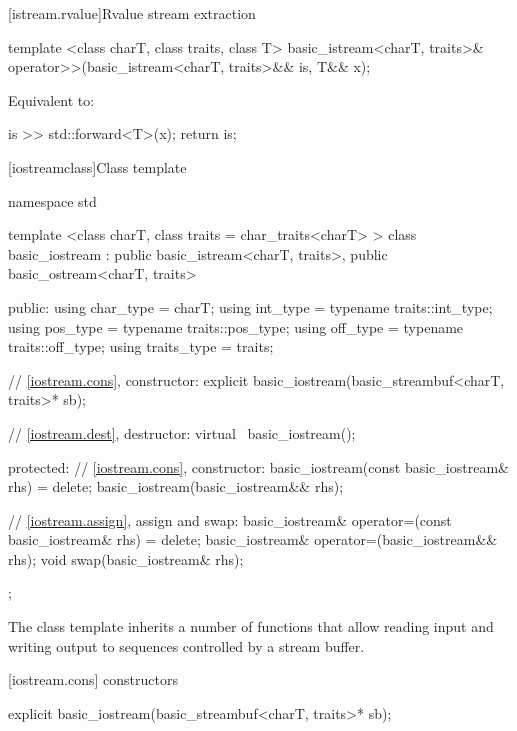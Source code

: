 [istream.rvalue]{Rvalue stream extraction}

%
\begin{itemdecl}
template <class charT, class traits, class T>
  basic_istream<charT, traits>&
  operator>>(basic_istream<charT, traits>&& is, T&& x);
\end{itemdecl}

\begin{itemdescr}
\pnum
\effects Equivalent to:
\begin{codeblock}
is >> std::forward<T>(x);
return is;
\end{codeblock}
\end{itemdescr}

[iostreamclass]{Class template }

%
\begin{codeblock}
namespace std {
  template <class charT, class traits = char_traits<charT> >
  class basic_iostream
    : public basic_istream<charT, traits>,
      public basic_ostream<charT, traits> {
  public:
    using char_type   = charT;
    using int_type    = typename traits::int_type;
    using pos_type    = typename traits::pos_type;
    using off_type    = typename traits::off_type;
    using traits_type = traits;

    // \ref{iostream.cons}, constructor:
    explicit basic_iostream(basic_streambuf<charT, traits>* sb);

    // \ref{iostream.dest}, destructor:
    virtual ~basic_iostream();

  protected:
    // \ref{iostream.cons}, constructor:
    basic_iostream(const basic_iostream& rhs) = delete;
    basic_iostream(basic_iostream&& rhs);

    // \ref{iostream.assign}, assign and swap:
    basic_iostream& operator=(const basic_iostream& rhs) = delete;
    basic_iostream& operator=(basic_iostream&& rhs);
    void swap(basic_iostream& rhs);
  };
}
\end{codeblock}

\pnum
The class template
inherits a number of functions that allow reading input and writing output to
sequences controlled by a stream buffer.

[iostream.cons]{ constructors}

%
\begin{itemdecl}
explicit basic_iostream(basic_streambuf<charT, traits>* sb);
\end{itemdecl}

